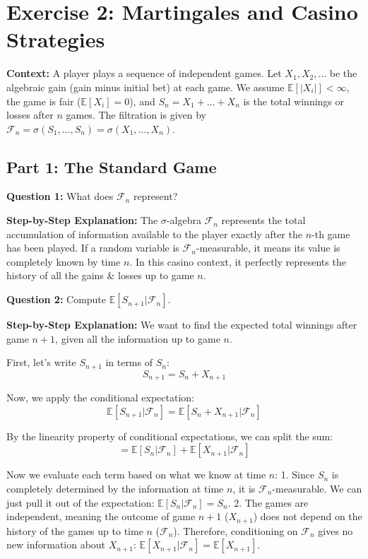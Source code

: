 \section{Exercise 2: Martingales and Casino Strategies}

\textbf{Context:} A player plays a sequence of independent games. Let $X_1, X_2, \dots$ be the algebraic gain (gain minus initial bet) at each game. We assume $\mathbb{E}[|X_i|] < \infty$, the game is fair ($\mathbb{E}[X_i] = 0$), and $S_n = X_1 + \dots + X_n$ is the total winnings \textendash{} or losses \textendash{} after $n$ games. The filtration is given by $\mathcal{F}_n = \sigma(S_1, \dots, S_n) = \sigma(X_1, \dots, X_n)$.

\subsection{Part 1: The Standard Game}

\textbf{Question 1:} What does $\mathcal{F}_n$ represent?

\textbf{Step-by-Step Explanation:}
The $\sigma$-algebra $\mathcal{F}_n$ represents the total accumulation of information available to the player exactly after the $n$-th game has been played. If a random variable is $\mathcal{F}_n$-measurable, it means its value is completely known by time $n$. In this casino context, it perfectly represents the history of all the gains \& losses up to game $n$.

\vspace{0.5cm}
\textbf{Question 2:} Compute $\mathbb{E}[S_{n+1} | \mathcal{F}_n]$.

\textbf{Step-by-Step Explanation:}
We want to find the expected total winnings after game $n+1$, given all the information up to game $n$. 

First, let's write $S_{n+1}$ in terms of $S_n$:
\[ S_{n+1} = S_n + X_{n+1} \]

Now, we apply the conditional expectation:
\[ \mathbb{E}[S_{n+1} | \mathcal{F}_n] = \mathbb{E}[S_n + X_{n+1} | \mathcal{F}_n] \]

By the linearity property of conditional expectations, we can split the sum:
\[ = \mathbb{E}[S_n | \mathcal{F}_n] + \mathbb{E}[X_{n+1} | \mathcal{F}_n] \]

Now we evaluate each term based on what we know at time $n$:
1. Since $S_n$ is completely determined by the information at time $n$, it is $\mathcal{F}_n$-measurable. We can just pull it out of the expectation: $\mathbb{E}[S_n | \mathcal{F}_n] = S_n$.
2. The games are independent, meaning the outcome of game $n+1$ ($X_{n+1}$) does not depend on the history of the games up to time $n$ ($\mathcal{F}_n$). Therefore, conditioning on $\mathcal{F}_n$ gives no new information about $X_{n+1}$: $\mathbb{E}[X_{n+1} | \mathcal{F}_n] = \mathbb{E}[X_{n+1}]$.


